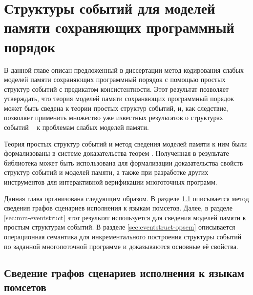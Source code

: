 \chapter{Структуры событий для моделей памяти сохраняющих программный порядок}
\label{ch:porf-evenstruct}

В данной главе описан предложенный в диссертации метод 
кодирования слабых моделей памяти сохраняющих программный порядок 
с помощью простых структур событий с предикатом консистентности. 
Этот результат позволяет утверждать, что теория  
моделей памяти сохраняющих программный порядок 
может быть сведена к теории простых структур событий, 
и, как следствие, позволяет применить множество 
уже известных результатов о структурах событий%
~\cite{Winskel:86,Vaandrager:TCS1991,Sassone:MFCS1993,Nielsen:REX93,Winskel-TCS:09}
к проблемам слабых моделей памяти.

Теория простых структур событий и метод сведения 
моделей памяти к ним были формализованы в системе 
доказательства теорем \coq. 
Полученная в результате библиотека может быть использована 
для формализации доказательства свойств структур событий 
и моделей памяти, а также при разработке других
инструментов для интерактивной верификации многоточных программ.

Данная глава организована следующим образом. 
В разделе \cref{sec:pomset-graphs} описывается метод 
сведения графов сценариев исполнения к языкам помсетов. 
Далее, в разделе \cref{sec:mm-eventstruct} этот результат 
используется для сведения моделей памяти к простым структурам событий. 
В разделе \cref{sec:eventstruct-opsem} описывается 
операционная семантика для инкрементального построения 
структуры событий по заданной многопоточной программе 
и доказываются основные её свойства. 

\section{Сведение графов сценариев исполнения к языкам помсетов}
\label{sec:pomset-graphs}


